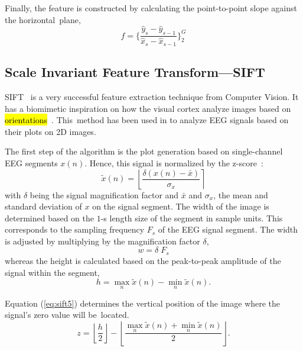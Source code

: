 \documentclass[brainsci,article,accept,moreauthors,pdftex,10pt,a4paper]{mdpi}
\begin{document}
Finally, the feature is constructed by calculating the point-to-point slope against the horizontal~plane,
\begin{equation}
f = \bigg \{  \frac{\hat{y}_{s}-\hat{y}_{s-1}}{\hat{x}_{s}-\hat{x}_{s-1}}  \bigg \}_{2}^{G} 
\label{eq:shcc8}
\end{equation}


\subsection{Scale Invariant Feature Transform---SIFT}

SIFT~\citep{Lowe2004} is a very successful feature extraction technique from Computer Vision.  It has a biomimetic inspiration on how the visual cortex analyze images based on \hl{orientations}~\citep{Edelman1997}.  This~method has been used in \citep{Ramele2016} to analyze EEG signals based on their plots on 2D images.%

The first step of the algorithm is the plot generation based on single-channel EEG segments $ x(n) $.  Hence, this signal is normalized by the z-score~\citep{Zhang2013}: 
\begin{equation}
\tilde{x}(n) = \left\lfloor \frac{\delta ( x(n) - \bar{x})}{\sigma_{x}} \right\rceil 
\label{eq:sift1}
\end{equation}
with $\delta$ being the signal magnification factor and $\bar{x}$ and $\sigma_{x}$, the mean and standard deviation of $x$ on the signal segment.  The width of the image is determined based on the $1$-s length size of the segment in sample units. This corresponds to the sampling frequency $F_s$ of the EEG signal segment. The width is adjusted by multiplying by the magnification factor $\delta$, 
\begin{equation}
w = \delta \; F_s
\label{eq:sift2}
\end{equation}
whereas the height is calculated based on the peak-to-peak amplitude of the signal within the segment,
\begin{equation}
h = \max_{n} \tilde{x}(n) - \min_{n} \tilde{x}(n).
\label{eq:sift4}
\end{equation}

Equation (\ref{eq:sift5}) determines the vertical position of the image where the signal's zero value will be~located.
\begin{equation}
z = \left\lfloor \frac{h}{2} \right\rfloor - \left\lfloor \frac{\max_{n} \tilde{x}(n) + \min_{n} \tilde{x}(n)}{2} \right\rfloor.
\label{eq:sift5}
\end{equation}
\end{document}
